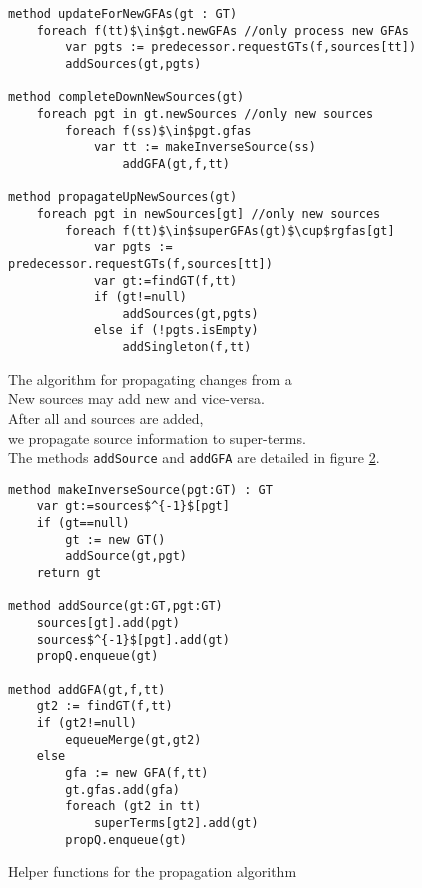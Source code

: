 \begin{figure}
\begin{lstlisting}
method updateForNewGFAs(gt : GT)
	foreach f(tt)$\in$gt.newGFAs //only process new GFAs
		var pgts := predecessor.requestGTs(f,sources[tt])
		addSources(gt,pgts)
	
method completeDownNewSources(gt)
	foreach pgt in gt.newSources //only new sources
		foreach f(ss)$\in$pgt.gfas
			var tt := makeInverseSource(ss)
				addGFA(gt,f,tt)

method propagateUpNewSources(gt)
	foreach pgt in newSources[gt] //only new sources
		foreach f(tt)$\in$superGFAs(gt)$\cup$rgfas[gt]
			var pgts := predecessor.requestGTs(f,sources[tt])
			var gt:=findGT(f,tt)
			if (gt!=null) 
				addSources(gt,pgts)
			else if (!pgts.isEmpty)
				addSingleton(f,tt)
\end{lstlisting}
\caption{The algorithm for propagating changes from a \GT{}\\
New sources may add new \GFAs{} and vice-versa.\\
After all \GFAs{} and sources are added, \\
we propagate source information to super-terms.\\
The methods \lstinline|addSource| and \lstinline|addGFA| are detailed in figure \ref{EC_propagate_helpers}.
}
\label{EC_propagate_GT}
\end{figure}

\begin{figure}
\begin{lstlisting}
method makeInverseSource(pgt:GT) : GT
	var gt:=sources$^{-1}$[pgt]
	if (gt==null)
		gt := new GT()
		addSource(gt,pgt)
	return gt

method addSource(gt:GT,pgt:GT)
	sources[gt].add(pgt)
	sources$^{-1}$[pgt].add(gt)
	propQ.enqueue(gt)
				
method addGFA(gt,f,tt)
	gt2 := findGT(f,tt)
	if (gt2!=null)
		equeueMerge(gt,gt2)
	else
		gfa := new GFA(f,tt)
		gt.gfas.add(gfa)
		foreach (gt2 in tt)
			superTerms[gt2].add(gt)
		propQ.enqueue(gt)
\end{lstlisting}
\caption{Helper functions for the propagation algorithm\\
}
\label{EC_propagate_helpers}
\end{figure}


